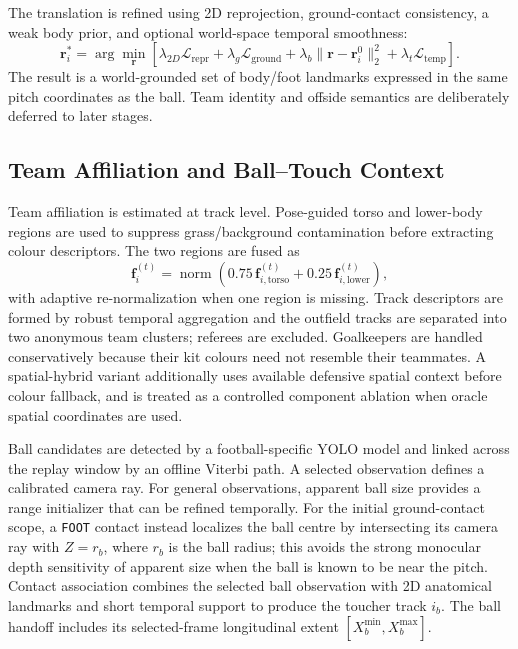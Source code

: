 \documentclass[runningheads]{llncs}
\begin{document}
The translation is refined using 2D reprojection, ground-contact consistency, a weak body prior, and optional world-space temporal smoothness:
\begin{equation}
\mathbf r_i^*=
\arg\min_{\mathbf r}
\left[
\lambda_{2D}\mathcal L_{\mathrm{repr}}
+\lambda_g\mathcal L_{\mathrm{ground}}
+\lambda_b\lVert\mathbf r-\mathbf r_i^0\rVert_2^2
+\lambda_t\mathcal L_{\mathrm{temp}}
\right].
\label{eq:root_refinement}
\end{equation}
The result is a world-grounded set of body/foot landmarks expressed in the same pitch coordinates as the ball. Team identity and offside semantics are deliberately deferred to later stages.

\subsection{Team Affiliation and Ball--Touch Context}
\label{subsec:team_ball}

Team affiliation is estimated at track level. Pose-guided torso and lower-body regions are used to suppress grass/background contamination before extracting colour descriptors. The two regions are fused as
\begin{equation}
\mathbf f_i^{(t)}=
\operatorname{norm}\!\left(
0.75\,\mathbf f_{i,\mathrm{torso}}^{(t)}
+0.25\,\mathbf f_{i,\mathrm{lower}}^{(t)}
\right),
\label{eq:team_feature}
\end{equation}
with adaptive re-normalization when one region is missing. Track descriptors are formed by robust temporal aggregation and the outfield tracks are separated into two anonymous team clusters; referees are excluded. Goalkeepers are handled conservatively because their kit colours need not resemble their teammates. A spatial-hybrid variant additionally uses available defensive spatial context before colour fallback, and is treated as a controlled component ablation when oracle spatial coordinates are used.

Ball candidates are detected by a football-specific YOLO model and linked across the replay window by an offline Viterbi path. A selected observation defines a calibrated camera ray. For general observations, apparent ball size provides a range initializer that can be refined temporally. For the initial ground-contact scope, a \texttt{FOOT} contact instead localizes the ball centre by intersecting its camera ray with $Z=r_b$, where $r_b$ is the ball radius; this avoids the strong monocular depth sensitivity of apparent size when the ball is known to be near the pitch. Contact association combines the selected ball observation with 2D anatomical landmarks and short temporal support to produce the toucher track $i_b$. The ball handoff includes its selected-frame longitudinal extent $[X_b^{\min},X_b^{\max}]$.
\end{document}
